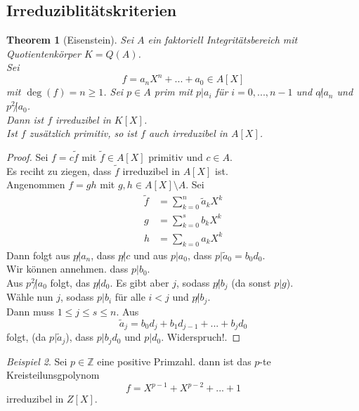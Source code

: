 \documentclass[10pt,a4paper]{article}
\newcommand{\Z}{\ensuremath{\mathbb{Z}}}
\theoremstyle{plain}
\newtheorem{theorem}{Theorem}[section]
\theoremstyle{definition}
\theoremstyle{remark}
\newtheorem{exm}[theorem]{Beispiel}
\begin{document}
	\subsection{Irreduziblitätskriterien}
	\begin{theorem}[Eisenstein]
		Sei $A$ ein faktoriell Integritätsbereich mit Quotientenkörper $K=Q(A)$.\\
		Sei
		\[f=a_nX^n+...+a_0\in A[X]\]
		mit $\deg(f)=n\geq 1$. Sei $p\in A$ prim mit $p|a_i$ für $i=0,...,n-1$ und $a\not|a_n$ und $p^2\not |a_0$.\\
		Dann ist $f$ irreduzibel in $K[X]$.\\
		Ist $f$ zusätzlich primitiv, so ist $f$ auch irreduzibel in $A[X]$.
	\end{theorem}
	\begin{proof}
		Sei $f=c\tilde f$ mit $\tilde f\in A[X]$ primitiv und $c\in A$.\\
		Es reciht zu ziegen, dass $\tilde f$ irreduzibel in $A[X]$ ist.\\
		Angenommen $f=gh$ mit $g,h\in A[X]\setminus A$. Sei
		\begin{align*}
		\tilde f&=\sum_{k=0}^{n}\tilde a_kX^k\\
		g&=\sum_{k=0}^{s}b_kX^k\\
		h&=\sum_{k=0} a_kX^k
		\end{align*}
		Dann folgt aus $p\not|a_n$, dass $p\not|c$ und aus $p|a_0$, dass $p|\tilde a_0=b_0d_0$.\\
		Wir können annehmen. dass $p|b_0$.\\
		Aus $p^2\not |a_0$ folgt, das $p\not| d_0$. Es gibt aber $j$, sodass $p\not|b_j$ (da sonst $p|g$).\\
		Wähle nun $j$, sodass $p|b_i$ für alle $i<j$ und $p\not| b_j$.\\
		Dann muss $1\leq j\leq s\leq n$. Aus 
		\[\tilde a_j=b_0d_j+b_1d_{j-1}+...+b_jd_0\]
		folgt, (da $p|\tilde a_j$), dass $p|b_jd_0$ und $p|d_0$. Widerspruch!.
	\end{proof}

	\begin{exm}
		Sei $p\in\Z$ eine positive Primzahl. dann ist das $p$-te Kreisteilunsgpolynom
		\[f=X^{p-1}+X^{p-2}+...+1\]
		irreduzibel in $Z[X]$.
	\end{exm}
\end{document}
